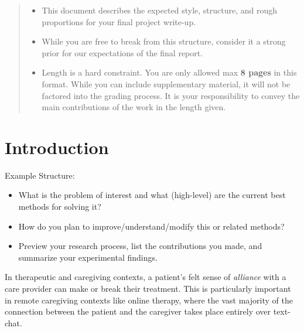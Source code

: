 \documentclass{article}
\begin{document}

\begin{abstract}
  \begin{itemize}
  \item This document describes the expected style, structure, and rough proportions for your final project write-up.
  \item While you are free to break from this structure, consider it a strong prior for our expectations of the final report.
  \item Length is a hard constraint. You are only allowed max \textbf{8 pages} in this format. While you can include supplementary material, it will not be factored into the grading process. It is your responsibility to convey the main contributions of the work in the length given.
  \end{itemize}


\end{abstract}

\section{Introduction}
\label{sec:introduction}

Example Structure:
\begin{itemize}
\item What is the problem of interest and what (high-level) are the current best methods for solving it?
\item How do you plan to improve/understand/modify this or related methods?
\item Preview your research process, list the contributions you made, and summarize your experimental findings.
\end{itemize}



In therapeutic and caregiving contexts, a patient’s felt sense of \textit{alliance} with a care provider can make or break their treatment. This is particularly important in remote caregiving contexts like online therapy, where the vast majority of the connection between the patient and the caregiver takes place entirely over text-chat. 

\end{document}
